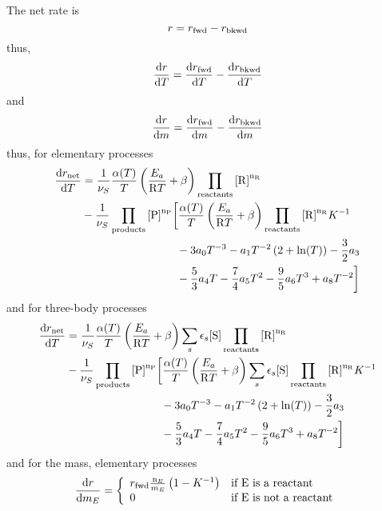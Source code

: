 The net rate is
\begin{equation}
r = r_\text{fwd} - r_\text{bkwd}
\end{equation}
thus,
\begin{equation}
\frac{\mathrm{d}r}{\mathrm{d} T} = \frac{\mathrm{d}r_\text{fwd}}{\mathrm{d} T} - \frac{\mathrm{d}r_\text{bkwd}}{\mathrm{d} T}
\end{equation}
and
\begin{equation}
\doverdm{\rate} = \doverdm{\ratef} - \doverdm{\rateb}
\end{equation}
thus, for elementary processes
\begin{equation}
\begin{split}
\doverdT{r_{\text{net}}} &= \frac{1}{\scoef[S]} \frac{\kinMod}{T} \left(\frac{E_a}{\Rg T} + \beta\right) \prodReac\\
& -
\frac{1}{\scoef[S]} \prodProd 
\bigg[
        \frac{\kinMod}{T} \left(\frac{E_a}{\Rg T} + \beta\right)\prodReac \Eqconst^{-1} \\
                  &\hspace{3cm} - 3\tc{0}T^{-3} - \tc{1} T^{-2} \left(2 + \ln(T)\right) - \frac{3}{2} \tc{3} \\
                  &\hspace{3cm} - \frac{5}{3} \tc{4} T - \frac{7}{4}\tc{5} T^2 - \frac{9}{5}\tc{6} T^3 + \tc{8} T^{-2} \bigg]
\end{split}
\end{equation}
and for three-body processes
\begin{equation}
\begin{split}
\doverdT{r_{\text{net}}} &= \frac{1}{\scoef[S]} \frac{\kinMod}{T} \left(\frac{E_a}{\Rg T} + \beta\right) \threeBody\prodReac\\
& -
\frac{1}{\scoef[S]} \prodProd 
\bigg[
        \frac{\kinMod}{T} \left(\frac{E_a}{\Rg T} + \beta\right)\threeBody\prodReac \Eqconst^{-1} \\
                  &\hspace{3cm} - 3\tc{0}T^{-3} - \tc{1} T^{-2} \left(2 + \ln(T)\right) - \frac{3}{2} \tc{3} \\
                  &\hspace{3cm} - \frac{5}{3} \tc{4} T - \frac{7}{4}\tc{5} T^2 - \frac{9}{5}\tc{6} T^3 + \tc{8} T^{-2} \bigg]
\end{split}
\end{equation}
and for the mass, elementary processes
\begin{equation}
\doverdm[E]{\rate} = \left\{\begin{array}{ll}
                        \ratef \frac{\scoefabs[E]}{\mass[E]}\left(1-\Eqconst^{-1}\right) & \text{if \ce{E} is a reactant} \\
                        0                                                                & \text{if \ce{E} is not a reactant} \\
                      \end{array}\right.
\end{equation}
